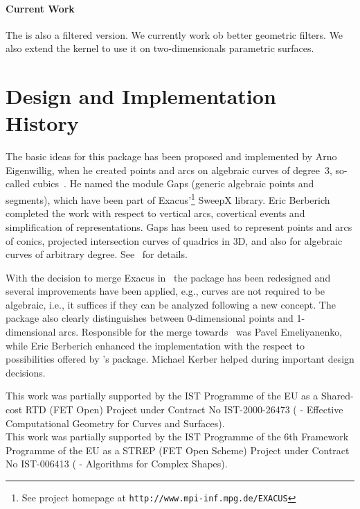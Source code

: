 \paragraph{Current Work}

The is also a filtered version. We currently work ob better geometric filters.
We also extend the kernel to use it on two-dimensionals parametric surfaces. 

\section{Design and Implementation History}

The basic ideas for this package has been proposed and implemented
by Arno Eigenwillig, when he created points and arcs on algebraic curves
of degree~3, so-called cubics~\cite{}. 
He named the module {\sc Gaps} (generic algebraic points and segments), 
which have been part of {\sc Exacus}'\footnote{See project homepage at 
{\tt http://www.mpi-inf.mpg.de/EXACUS}}
{\sc SweepX} library. Eric Berberich completed the work with respect
to vertical arcs, covertical events and simplification of representations.
{\sc Gaps} has been used to represent points and arcs of conics, projected
intersection curves of quadrics in 3D, and also for algebraic curves
of arbitrary degree. See~\cite{} for details.

With the decision to merge {\sc Exacus} in \cgal\, the package has been 
redesigned and several improvements have been applied, e.g., curves are not
required to be algebraic, i.e., it suffices if they can be analyzed following
a new concept. The package also clearly distinguishes between 0-dimensional
points and 1-dimensional arcs. Responsible for the merge towards \cgal\ was
Pavel Emeliyanenko, while Eric Berberich enhanced the implementation with the
respect to possibilities offered by 
\cgal's  package. Michael Kerber helped during
important design decisions.

This work was partially supported by the IST Programme of the EU as a
Shared-cost RTD (FET Open) Project under Contract No IST-2000-26473
( - Effective
Computational Geometry for Curves and Surfaces).\\
This work was partially supported by the IST Programme of the 6th
Framework Programme of the EU as a STREP (FET Open Scheme) Project
under Contract No IST-006413 ( -
Algorithms for Complex Shapes).
